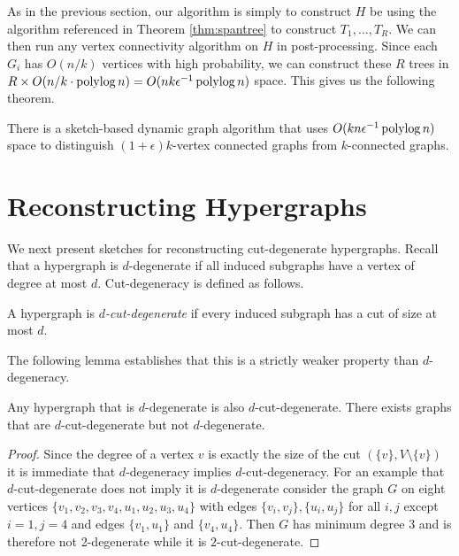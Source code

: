 As in the previous section, our algorithm is simply to construct $H$ be  using the algorithm referenced in Theorem \ref{thm:spantree} to construct $T_1, \ldots, T_R$. We can then run any vertex connectivity algorithm on $H$ in post-processing. Since each $G_i$ has $O(n/k)$ vertices with high probability, we can construct these $R$ trees in $R\times O(n/k \cdot \operatorname{polylog} n)=O(nk\epsilon^{-1}\operatorname{polylog} n)$ space. This gives us the following theorem.

\begin{theorem}
There is a sketch-based dynamic graph algorithm that uses $O(kn\epsilon^{-1} \operatorname{polylog} n)$ space to distinguish $(1+\epsilon)k$-vertex connected graphs from $k$-connected graphs.
\end{theorem}
%
%
%
%



\section{Reconstructing Hypergraphs}\label{sec:recon}

We next present sketches for reconstructing cut-degenerate hypergraphs. Recall that a hypergraph is $d$-degenerate if all induced subgraphs have a vertex of degree at most $d$. Cut-degeneracy is defined as follows.

\begin{definition}
A hypergraph is \emph{$d$-cut-degenerate} if every induced subgraph has a cut of size at most $d$.
\end{definition}

The following lemma establishes that this is a strictly weaker property than $d$-degeneracy.

\begin{lemma}
Any hypergraph that is $d$-degenerate is also $d$-cut-degenerate. There exists graphs that are    $d$-cut-degenerate but not $d$-degenerate.
\end{lemma}
\begin{proof}
Since the degree of a vertex $v$ is exactly the size of the cut $(\{v\},V\setminus \{v\})$ it is immediate that $d$-degeneracy implies $d$-cut-degeneracy. For an example that $d$-cut-degenerate does not imply it is $d$-degenerate consider the graph $G$ on eight vertices $\{v_1,v_2,v_3,v_4,u_1,u_2,u_3, u_4\}$ with edges $\{v_i,v_j\}, \{u_i,u_j\}$ for all $i,j$ except $i=1,j=4$ and edges $\{v_1,u_1\}$ and $\{v_4,u_4\}$. 
Then $G$ has minimum degree 3 and is therefore not 2-degenerate while it is $2$-cut-degenerate.
\end{proof}


